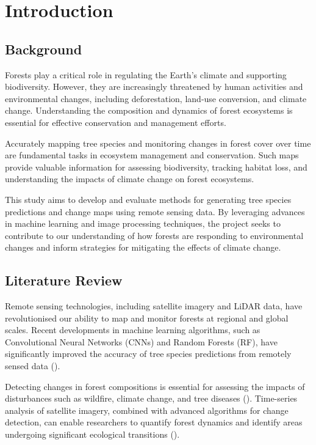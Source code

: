 \chapter{Introduction}
\label{chapter:intro}
\section{Background}

Forests play a critical role in regulating the Earth's climate and supporting biodiversity. However, they are increasingly threatened by human activities and environmental changes, including deforestation, land-use conversion, and climate change. Understanding the composition and dynamics of forest ecosystems is essential for effective conservation and management efforts.

Accurately mapping tree species and monitoring changes in forest cover over time are fundamental tasks in ecosystem management and conservation. Such maps provide valuable information for assessing biodiversity, tracking habitat loss, and understanding the impacts of climate change on forest ecosystems.

This study aims to develop and evaluate methods for generating tree species predictions and change maps using remote sensing data. By leveraging advances in machine learning and image processing techniques, the project seeks to contribute to our understanding of how forests are responding to environmental changes and inform strategies for mitigating the effects of climate change.

\section{Literature Review}

Remote sensing technologies, including satellite imagery and LiDAR data, have revolutionised our ability to map and monitor forests at regional and global scales. Recent developments in machine learning algorithms, such as Convolutional Neural Networks (CNNs) and Random Forests (RF), have significantly improved the accuracy of tree species predictions from remotely sensed data (\cite{belgium_classification, copernicus_main, germany_bavaria}).

Detecting changes in forest compositions is essential for assessing the impacts of disturbances such as wildfire, climate change, and tree diseases (\cite{usda}). Time-series analysis of satellite imagery, combined with advanced algorithms for change detection, can enable researchers to quantify forest dynamics and identify areas undergoing significant ecological transitions (\cite{indonesia}).

